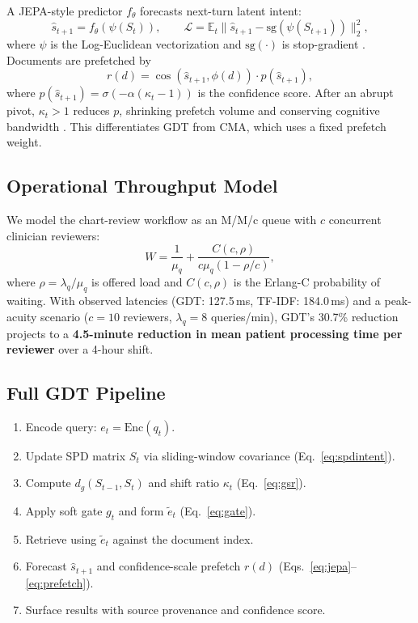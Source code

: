 \documentclass[11pt,a4paper]{article}
\begin{document}
A JEPA-style predictor $f_\theta$ forecasts next-turn latent intent:
\begin{equation}
  \hat{s}_{t+1} = f_\theta(\psi(S_t)), \qquad
  \mathcal{L} = \mathbb{E}_t\|\hat{s}_{t+1} - \mathrm{sg}(\psi(S_{t+1}))\|_2^2,
  \label{eq:jepa}
\end{equation}
where $\psi$ is the Log-Euclidean vectorization and $\mathrm{sg}(\cdot)$ is stop-gradient \cite{grill20}. Documents are prefetched by
\begin{equation}
  r(d) = \cos(\hat{s}_{t+1}, \phi(d)) \cdot p(\hat{s}_{t+1}),
  \label{eq:prefetch}
\end{equation}
where $p(\hat{s}_{t+1}) = \sigma(-\alpha(\kappa_t{-}1))$ is the confidence score. After an abrupt pivot, $\kappa_t{>}1$ reduces $p$, shrinking prefetch volume and conserving cognitive bandwidth \cite{sweller1988_cogl}. This differentiates GDT from CMA, which uses a fixed prefetch weight.

\subsection{Operational Throughput Model}
\label{sec:queueing}

We model the chart-review workflow as an M/M/c queue \cite{kleinrock1975,gross2008} with $c$ concurrent clinician reviewers:
\begin{equation}
  W = \frac{1}{\mu_q} + \frac{C(c,\rho)}{c\mu_q(1-\rho/c)},
  \label{eq:waiting_time}
\end{equation}
where $\rho{=}\lambda_q/\mu_q$ is offered load and $C(c,\rho)$ is the Erlang-C probability of waiting. With observed latencies (GDT: 127.5\,ms, TF-IDF: 184.0\,ms) and a peak-acuity scenario ($c{=}10$ reviewers, $\lambda_q{=}8$ queries/min), GDT's 30.7\% reduction projects to a \textbf{4.5-minute reduction in mean patient processing time per reviewer} over a 4-hour shift.

\subsection{Full GDT Pipeline}

\begin{enumerate}
  \item Encode query: $e_t = \mathrm{Enc}(q_t)$.
  \item Update SPD matrix $S_t$ via sliding-window covariance (Eq.~\ref{eq:spdintent}).
  \item Compute $d_g(S_{t-1},S_t)$ and shift ratio $\kappa_t$ (Eq.~\ref{eq:gsr}).
  \item Apply soft gate $g_t$ and form $\tilde{e}_t$ (Eq.~\ref{eq:gate}).
  \item Retrieve using $\tilde{e}_t$ against the document index.
  \item Forecast $\hat{s}_{t+1}$ and confidence-scale prefetch $r(d)$ (Eqs.~\ref{eq:jepa}--\ref{eq:prefetch}).
  \item Surface results with source provenance and confidence score.
\end{enumerate}
\end{document}
